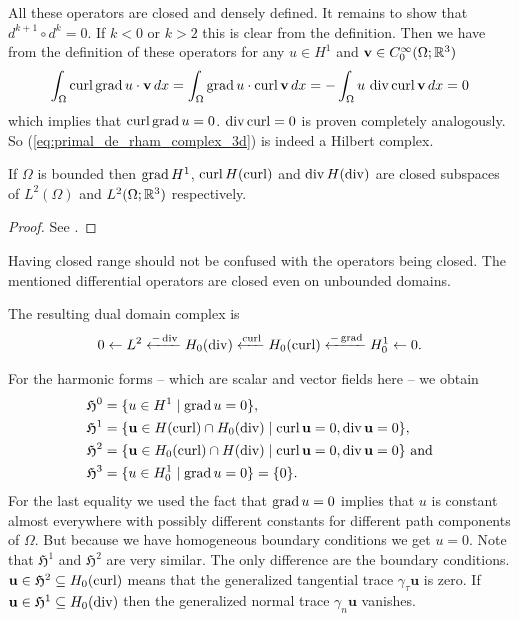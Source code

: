 \documentclass[../master_thesis.tex]{subfiles}
\begin{document}
All these operators are closed and densely defined. It remains to show that 
$d^{k+1} \circ d^k = 0$. If $k < 0$ or $k>2$ this is clear from the definition. 
Then we have from the definition of these operators 
for any $u \in H^1$ and $\mathbf{v} \in C^\infty_0(\Omega;\mathbb{R}^3)$  
\begin{align*}
    \int_\Omega \operatorname{curl} \operatorname{grad} u \cdot \mathbf{v} \, dx 
    = \int_\Omega \operatorname{grad} u \cdot \operatorname{curl} \mathbf{v} \, dx 
    = -\int_\Omega u \, \operatorname{div} \operatorname{curl} \mathbf{v} \, dx
    = 0
\end{align*}
which implies that $\operatorname{curl} \operatorname{grad} u = 0$. $\operatorname{div} \operatorname{curl} = 0$ is proven 
completely analogously. So (\ref{eq:primal_de_rham_complex_3d}) is indeed a 
Hilbert complex. 

\begin{theorem}\label{thm:closed_range}
    If $\Omega$ is bounded then $\operatorname{grad} H^1$, $\operatorname{curl} H(\operatorname{curl})$ and 
    $\operatorname{div} H(\operatorname{div})$ are closed subspaces of $L^2(\Omega)$ and 
    $L^2(\Omega;\mathbb{R}^3)$ respectively.
\end{theorem}
\begin{proof}
    See \cite[p.38]{arnold}.
\end{proof}
Having closed range should not be confused with the operators being closed.
The mentioned differential operators are closed even on unbounded domains.

The resulting dual domain complex is 
\begin{align*}
    0 \leftarrow L^2 \xleftarrow{-\operatorname{div}} H_0(\operatorname{div})
        \xleftarrow{\operatorname{curl}} H_0(\operatorname{curl}) 
        \xleftarrow{-\operatorname{grad}} H^1_0 \leftarrow 0.
\end{align*}

For the harmonic forms -- which are scalar and vector fields here -- 
we obtain
\begin{align*}
    \mathfrak{H}^0 &= \{ u \in H^1 \mid \operatorname{grad} u = 0\},
    \\ \mathfrak{H}^1 &= \{ \mathbf{u} \in H(\operatorname{curl}) \cap H_0(\operatorname{div})
        \mid \operatorname{curl} \mathbf{u} = 0, \operatorname{div} \mathbf{u} = 0\},
    \\ \mathfrak{H}^2 &= \{ \mathbf{u} \in H_0(\operatorname{curl}) \cap H(\operatorname{div})
        \mid \operatorname{curl} \mathbf{u} = 0, \operatorname{div} \mathbf{u} = 0\} \text{ and}
    \\ \mathfrak{H}^3 &= \{ u \in H^1_0
       \mid \operatorname{grad} u = 0\} = \{0\}.
\end{align*}
For the last equality we used the fact that $\operatorname{grad} u = 0$ implies that 
$u$ is constant almost everywhere with possibly different constants for 
different path components of $\Omega$. But because we have homogeneous boundary 
conditions we get $u=0$. Note that $\mathfrak{H}^1$ and $\mathfrak{H}^2$ 
are very similar. The only difference are the boundary conditions. 
$\mathbf{u} \in \mathfrak{H}^2 \subseteq H_0(\operatorname{curl})$ 
means that the generalized tangential 
trace $\gamma_\tau \mathbf{u}$ is zero. If $\mathbf{u}  \in \mathfrak{H}^1 
\subseteq H_0(\operatorname{div})$ 
then the 
generalized normal trace $\gamma_n \mathbf{u}$ vanishes.
\end{document}
